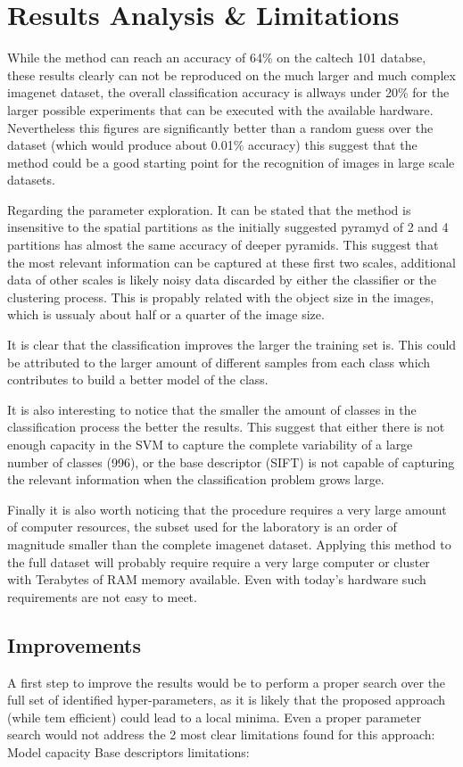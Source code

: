 \documentclass[10pt,twocolumn,letterpaper]{article}
\begin{document}
\section{Results Analysis \& Limitations}

While the method can reach an accuracy of 64\% on the caltech 101 databse, these results clearly can not be reproduced on the much larger and much complex imagenet dataset, the overall classification accuracy is allways under 20\% for the larger possible experiments that can be executed with the available hardware. Nevertheless this figures are significantly better than a random guess over the dataset (which would produce about 0.01\% accuracy) this suggest that the method could be a good starting point for the recognition of images in large scale datasets.

Regarding the parameter exploration. It can be stated that the method is insensitive to the spatial partitions as the initially suggested pyramyd of 2 and 4 partitions has almost the same accuracy of deeper pyramids. This suggest that the most relevant information can be captured at these first two scales, additional data of other scales is likely noisy data discarded by either the classifier or the clustering process. This is propably related with the object size in the images, which is ussualy about half or a quarter of the image size.

It is clear that the classification improves the larger the training set is. This could be attributed to the larger amount of different samples from each class which contributes to build a better model of the class.

It is  also interesting to notice that the smaller the amount of classes in the classification process the better the results. This suggest that either there is not enough capacity in the SVM to capture the complete variability of a large number of classes (996), or the base descriptor (SIFT) is not capable of capturing the relevant information when the classification problem grows large.

Finally it is also worth noticing that the procedure requires a very large amount of computer resources, the subset used for the laboratory is an order of magnitude smaller than the complete imagenet dataset. Applying this method to the full dataset will probably require require a very large computer or cluster with Terabytes of RAM memory available. Even with today's hardware such requirements are not easy to meet.

\subsection{Improvements}
A first step to improve the results would be to perform a proper search over the full set of identified hyper-parameters, as it is likely that the proposed approach (while tem efficient) could lead to a local minima. Even a proper parameter search would not address the 2 most clear limitations found for this approach: Model capacity Base descriptors limitations:
\end{document}
